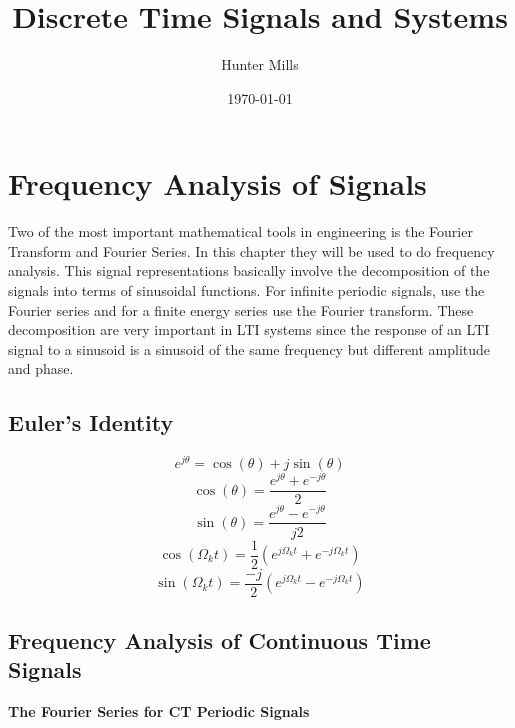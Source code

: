 \documentclass{article} %
\title{Discrete Time Signals and Systems} %
\author{Hunter Mills} %
\date{\today} %
\begin{document}
    \maketitle %
    
    \section{Frequency Analysis of Signals} %
    Two of the most important mathematical tools in engineering is the Fourier Transform and Fourier Series. In this chapter they will be used to do frequency analysis. This signal representations basically involve the decomposition of the signals into terms of sinusoidal functions. For infinite periodic signals, use the Fourier series and for a finite energy series use the Fourier transform. These decomposition are very important in LTI systems since the response of an LTI signal to a sinusoid is a sinusoid of the same frequency but different amplitude and phase.
    \subsection{Euler's Identity}
    \begin{equation}
 	e^{j\theta} = \cos(\theta) + j\sin(\theta)
	\end{equation}
	\begin{equation}
 	\cos(\theta) = \frac{e^{j\theta} + e^{-j\theta}}{2}
	\end{equation}
	\begin{equation}
 	\sin(\theta) = \frac{e^{j\theta} - e^{-j\theta}}{j2}
	\end{equation}
	\begin{equation}
 	\cos(\Omega_k t) = \frac{1}{2}(e^{j\Omega_k t} + e^{-j\Omega_k t})
	\end{equation}
	\begin{equation}
 	\sin(\Omega_k t) = \frac{-j}{2}(e^{j\Omega_k t} - e^{-j\Omega_k t})
	\end{equation}
    
    \subsection{Frequency Analysis of Continuous Time Signals}
    \textbf{The Fourier Series for CT Periodic Signals}
    
\end{document}
